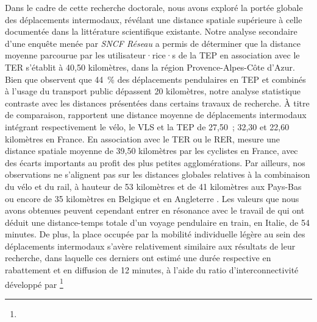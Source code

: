 \begin{refsegment}
Dans le cadre de cette recherche doctorale, nous avons exploré la portée globale des déplacements intermodaux, révélant une distance spatiale supérieure à celle documentée dans la littérature scientifique existante. Notre analyse secondaire d'une enquête menée par \textsl{SNCF Réseau} a permis de déterminer que la distance moyenne parcourue par les utilisateur·rice·s de la \acrshort{TEP} en association avec le \acrshort{TER} s'établit à 40,50 kilomètres, dans la région Provence-Alpes-Côte d'Azur. Bien que \textcolor{blue}{\textcite[8]{edel_potential_2021}} observent que 44~\% des déplacements pendulaires en \acrshort{TEP} et combinés à l'usage du transport public dépassent 20 kilomètres, notre analyse statistique contraste avec les distances présentées dans certains travaux de recherche. À titre de comparaison, \textcolor{blue}{\textcite[7]{rabaud_micromobilites_2019}} rapportent une distance moyenne de déplacements intermodaux intégrant respectivement le vélo, le \acrshort{VLS} et la \acrshort{TEP} de 27,50~; 32,30 et 22,60 kilomètres en France. En association avec le \acrshort{TER} ou le \acrshort{RER}, \textcolor{blue}{\textcite[16]{gioria_etude_2016}} mesure une distance spatiale moyenne de 39,50 kilomètres par les cyclistes en France, avec des écarts importants au profit des plus petites agglomérations. Par ailleurs, nos observations ne s'alignent pas sur les distances globales relatives à la combinaison du vélo et du rail, à hauteur de 53 kilomètres et de 41 kilomètres aux Pays-Bas \textcolor{blue}{\autocites[14]{shelat_analysing_2018}[225]{keijer_how_2000}} ou encore de 35 kilomètres en Belgique et en Angleterre \textcolor{blue}{\autocite[20 ; 28]{bitibi_bike_2017}}. Les valeurs que nous avons obtenues peuvent cependant entrer en résonance avec le travail de \textcolor{blue}{\textcite[116]{nigro_land_2019}} qui ont déduit une distance-temps totale d'un voyage pendulaire en train, en Italie, de 54 minutes. De plus, la place occupée par la mobilité individuelle légère au sein des déplacements intermodaux s'avère relativement similaire aux résultats de leur recherche, dans laquelle ces derniers ont estimé une durée respective en rabattement et en diffusion de 12 minutes, à l'aide du ratio d'interconnectivité développé par \textcolor{blue}{\textcite[274]{krygsman_multimodal_2004}}\footnote{
}
\end{refsegment}
